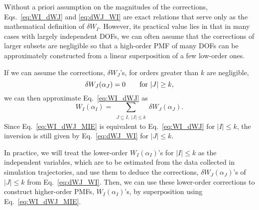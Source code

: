 \documentclass[reprint, superscriptaddress]{revtex4-1}
\begin{document}
Without a priori assumption on the magnitudes of the corrections,
Eqs.~\eqref{eq:WI_dWJ} and \eqref{eq:dWJ_WI} are exact relations
that serve only as the mathematical definition of $\delta W_I$.
%
However, its practical value lies in that in many cases
with largely independent DOFs,
we can often assume
that the corrections of larger subsets are negligible
so that a high-order PMF of many DOFs can be approximately constructed
from a linear superposition of a few low-order ones.


If we can assume the corrections, $\delta W_J$'s,
for orders greater than $k$ are negligible,
%
\begin{equation}
  \delta W_J(\alpha_J) = 0
  \qquad
  \mbox{for $|J| \ge k$}
  ,
  \notag
\end{equation}
%
we can then approximate Eq.~\eqref{eq:WI_dWJ} as
%
\begin{equation}
  W_I(\alpha_I)
  =
  \sum_{ \substack{J \subseteq I, \; |J| \le k} }
  \!\! \delta W_J(\alpha_J)
  .
  \label{eq:WI_dWJ_MIE}
\end{equation}
%
Since Eq.~\eqref{eq:WI_dWJ_MIE}
is equivalent to Eq.~\eqref{eq:WI_dWJ}
for $|I| \le k$,
the inversion is still given by Eq.~\eqref{eq:dWJ_WI} for $|J| \le k$.

In practice, we will treat the lower-order $W_I(\alpha_I)$'s
for $|I| \le k$ as the independent variables,
which are to be estimated from the data collected in simulation trajectories,
%
and use them to deduce the corrections,
$\delta W_J(\alpha_J)$'s of $|J| \le k$ from Eq.~\eqref{eq:dWJ_WI}.
%
Then, we can use these lower-order corrections
to construct higher-order PMFs, $W_I(\alpha_I)$'s,
by superposition using Eq.~\eqref{eq:WI_dWJ_MIE}.
\end{document}
